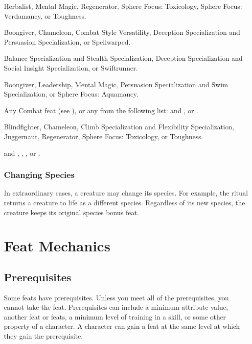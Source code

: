             Herbalist, Mental Magic, Regenerator, Sphere Focus: Toxicology, Sphere Focus: Verdamancy, or Toughness.

             Boongiver, Chameleon, Combat Style Versatility, Deception Specialization and Persuasion Specialization, or Spellwarped.

             Balance Specialization and Stealth Specialization, Deception Specialization and Social Insight Specialization, or Swiftrunner.

             Boongiver, Leadership, Mental Magic, Persuasion Specialization and Swim Specialization, or Sphere Focus: Aquamancy.

             Any Combat feat (see ), or any from the following list:  and , or .

             Blindfighter, Chameleon, Climb Specialization and Flexibility Specialization, Juggernaut, Regenerator, Sphere Focus: Toxicology, or Toughness.

              and , , , or .

        \subsubsection{Changing Species}
            In extraordinary cases, a creature may change its species.
            For example, the  ritual returns a creature to life as a different species.
            Regardless of its new species, the creature keeps its original species bonus feat.

\section{Feat Mechanics}

    \subsection{Prerequisites}
        Some feats have prerequisites.
        Unless you meet all of the prerequisites, you cannot take the feat.
        Prerequisites can include a minimum attribute value, another feat or feats, a minimum level of training in a skill, or some other property of a character.
        A character can gain a feat at the same level at which they gain the prerequisite.

